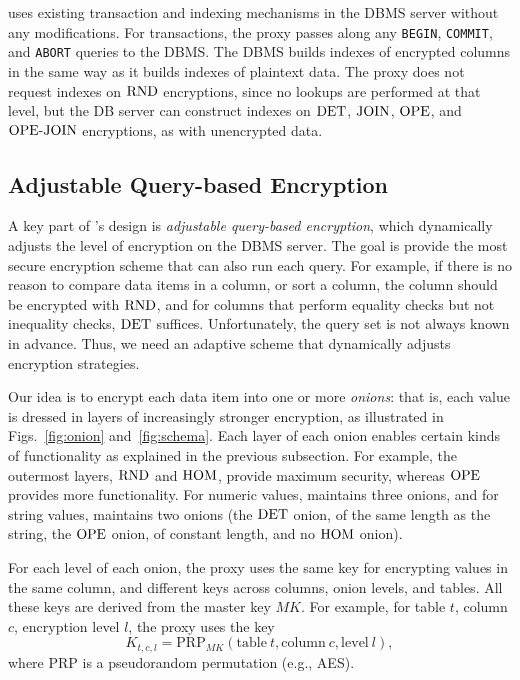 \name{} uses existing transaction and indexing mechanisms in the DBMS
server without any modifications.  For transactions, the proxy passes
along any {\tt BEGIN}, {\tt COMMIT}, and {\tt ABORT} queries to the
DBMS\@.
The DBMS builds indexes of encrypted columns in the same way as it
builds indexes of plaintext data.  The proxy does not request indexes
on $\textrm{RND}$ encryptions, since no lookups are performed at that level,
but the DB server can construct indexes on $\textrm{DET}$, $\textrm{JOIN}$, $\textrm{OPE}$, and
$\textrm{OPE-JOIN}$ encryptions, as with unencrypted data.

\subsection{Adjustable Query-based Encryption}
\label{ss:onion}

A key part of \name{}'s design is \textit{adjustable query-based
  encryption}, which dynamically adjusts the level of encryption on
the DBMS server.  The goal is provide the most secure encryption
scheme that can also run each query.  For example, if there
is no reason to compare data items in a column, or sort a column, the
column should be encrypted with $\textrm{RND}$, and for columns that perform
equality checks but not inequality checks, $\textrm{DET}$ suffices.
Unfortunately, the query set is not always known in advance.
Thus, we need an adaptive scheme that dynamically
adjusts encryption strategies.

Our idea is to encrypt each data item into one or more \textit{onions}:
that is, each value is dressed in layers of increasingly
stronger encryption, as illustrated in Figs.~\ref{fig:onion}
and~\ref{fig:schema}. Each layer of
each onion enables certain kinds of functionality as explained in the
previous subsection.  For example, the outermost layers, $\textrm{RND}$ and
$\textrm{HOM}$, provide maximum security, whereas $\textrm{OPE}$ provides more
functionality.  For numeric values, \name{} maintains three onions,
and for string values, \name{} maintains two onions (the $\textrm{DET}$ onion,
of the same length as the string, the $\textrm{OPE}$ onion, of constant length,
and no $\textrm{HOM}$ onion).


For each level of each onion, the proxy uses the same key for
encrypting values in the same column, and different keys across
columns, onion levels, and tables.  All these keys are derived from
the master key $\mathit{MK}$\@.  For example, for table $t$, column $c$,
encryption level $l$, the proxy uses the key
\begin{equation}\label{eq:columnkey}
K_{t, c, l} = \textrm{PRP}_\mathit{MK} (\mathrm{table}\>t, \mathrm{column}\>c,
    \mathrm{level}\>l),
\end{equation}
where PRP is a pseudorandom permutation (e.g., AES).

